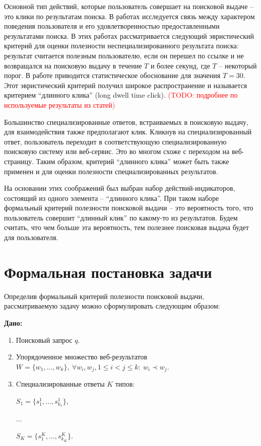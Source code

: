 \documentclass[12pt,a4paper]{report}
\newcommand\note[1]{\textcolor{red}{(#1)}}
\newcommand\todonote[1]{\note{TODO: #1}}
\begin{document}
Основной тип действий, которые пользователь совершает на поисковой выдаче -- это клики по результатам поиска. В работах \cite{Joachims, Fox-LDTClick, White, Kim} исследуется связь между характером поведения пользователя и его удовлетворенностью предоставленными результатами поиска. В этих работах рассматривается следующий эвристический критерий для оценки полезности неспециализированного результата поиска: результат считается полезным пользователю, если он перешел по ссылке и не возвращался на поисковую выдачу в течение $T$ и более секунд, где $T$ -- некоторый порог. В работе \cite{Fox-LDTClick} приводится статистическое обоснование для значения $T=30$. Этот эвристический критерий получил широкое распространение \cite{White, Kim} и называется критерием ``длинного клика'' (long dwell time click). \todonote{подробнее по используемые результаты из статей}

Большинство специализированные ответов, встраиваемых в поисковую выдачу, для взаимодействия также предполагают клик. Кликнув на специализированный ответ, пользователь переходит в соответствующую специализированную поисковую систему или веб-сервис. Это во многом схоже с переходом на веб-страницу. Таким образом, критерий ``длинного клика'' может быть также применен и для оценки полезности специализированных результатов.

На основании этих соображений был выбран набор действий-индикаторов, состоящий из одного элемента -- ``длинного клика''. При таком наборе формальный критерий полезности поисковой выдачи -- это вероятность того, что пользователь совершит ``длинный клик'' по какому-то из результатов. Будем считать, что чем больше эта вероятность, тем полезнее поисковая выдача будет для пользователя. 

\section{Формальная постановка задачи}
\label{sec:task-formal}

Определив формальный критерий полезности поисковой выдачи, рассматриваемую задачу можно сформулировать следующим образом:
\vspace{3mm}

\textbf{Дано:} 
\begin{enumerate}
\item Поисковый запрос $q$. 
\item Упорядоченное множество веб-результатов $W=\{w_1, ..., w_k\}, \ \forall w_i, w_j, 1 \le i < j \le k: \ w_i \prec w_j$.
\item Cпециализированные ответы $K$ типов: \par
$S_1=\{s^{1}_{1}, ..., s^{1}_{k_1}\},$ \par
$...$ \par
$S_K=\{s^{K}_{1}, ..., s^{K}_{k_K}\}$.
\end{enumerate}
\end{document}

